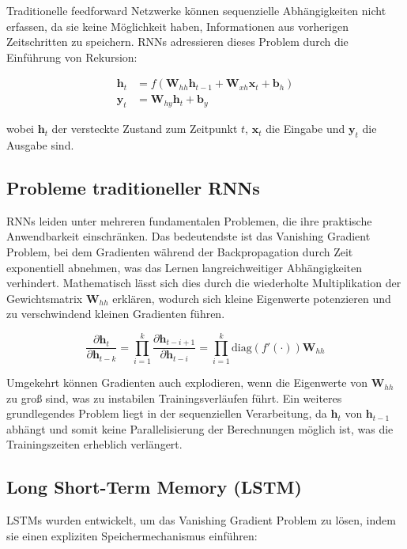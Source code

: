 Traditionelle feedforward Netzwerke können sequenzielle Abhängigkeiten nicht erfassen, da sie keine Möglichkeit haben, Informationen aus vorherigen Zeitschritten zu speichern. RNNs adressieren dieses Problem durch die Einführung von Rekursion:

\begin{align}
\mathbf{h}_t &= f(\mathbf{W}_{hh} \mathbf{h}_{t-1} + \mathbf{W}_{xh} \mathbf{x}_t + \mathbf{b}_h) \\
\mathbf{y}_t &= \mathbf{W}_{hy} \mathbf{h}_t + \mathbf{b}_y
\end{align}

wobei $\mathbf{h}_t$ der versteckte Zustand zum Zeitpunkt $t$, $\mathbf{x}_t$ die Eingabe und $\mathbf{y}_t$ die Ausgabe sind.

\subsection{Probleme traditioneller RNNs}

RNNs leiden unter mehreren fundamentalen Problemen, die ihre praktische Anwendbarkeit einschränken. Das bedeutendste ist das Vanishing Gradient Problem, bei dem Gradienten während der Backpropagation durch Zeit exponentiell abnehmen, was das Lernen langreichweitiger Abhängigkeiten verhindert. Mathematisch lässt sich dies durch die wiederholte Multiplikation der Gewichtsmatrix $\mathbf{W}_{hh}$ erklären, wodurch sich kleine Eigenwerte potenzieren und zu verschwindend kleinen Gradienten führen.

\begin{equation}
\frac{\partial \mathbf{h}_t}{\partial \mathbf{h}_{t-k}} = \prod_{i=1}^{k} \frac{\partial \mathbf{h}_{t-i+1}}{\partial \mathbf{h}_{t-i}} = \prod_{i=1}^{k} \text{diag}(f'(\cdot)) \mathbf{W}_{hh}
\end{equation}

Umgekehrt können Gradienten auch explodieren, wenn die Eigenwerte von $\mathbf{W}_{hh}$ zu groß sind, was zu instabilen Trainingsverläufen führt. Ein weiteres grundlegendes Problem liegt in der sequenziellen Verarbeitung, da $\mathbf{h}_t$ von $\mathbf{h}_{t-1}$ abhängt und somit keine Parallelisierung der Berechnungen möglich ist, was die Trainingszeiten erheblich verlängert.

\subsection{Long Short-Term Memory (LSTM)}

LSTMs wurden entwickelt, um das Vanishing Gradient Problem zu lösen, indem sie einen expliziten Speichermechanismus einführen:

